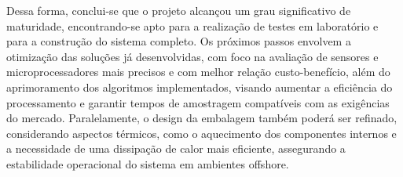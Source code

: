 \documentclass[a4paper, 12pt]{article}
\begin{document}
    Dessa forma, conclui-se que o projeto alcançou um grau significativo de maturidade, encontrando-se apto para a realização de testes em laboratório e para a construção do sistema completo. Os próximos passos envolvem a otimização das soluções já desenvolvidas, com foco na avaliação de sensores e microprocessadores mais precisos e com melhor relação custo-benefício, além do aprimoramento dos algoritmos implementados, visando aumentar a eficiência do processamento e garantir tempos de amostragem compatíveis com as exigências do mercado. Paralelamente, o design da embalagem também poderá ser refinado, considerando aspectos térmicos, como o aquecimento dos componentes internos e a necessidade de uma dissipação de calor mais eficiente, assegurando a estabilidade operacional do sistema em ambientes offshore.


\newpage


\end{document}
